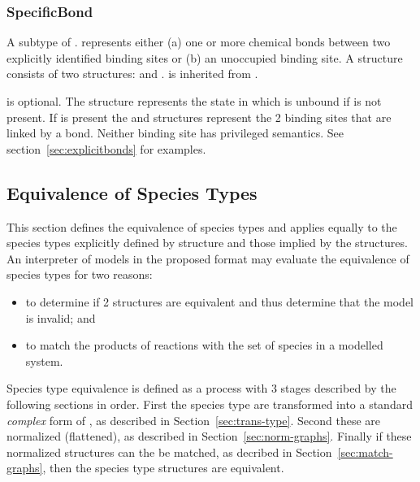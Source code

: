 \documentclass{cekarticle}
\begin{document}
\subsubsection{SpecificBond}

A subtype of .    represents
either (a) one or more chemical bonds between two explicitly
identified binding sites or (b) an unoccupied binding site.  A
 structure consists of two
 structures:  and
.  is
inherited from .

 is optional. The
 structure represents the state in which
 is unbound if
 is not present. If
 is present the
 and 
structures represent the 2 binding sites that are linked by a
bond. Neither binding site has privileged semantics. See
section~\ref{sec:explicitbonds} for examples.

\subsection{Equivalence of Species Types}
\label{sec:type-equals}

This section defines the equivalence of species types and applies
equally to the species types explicitly defined by
 structure and those implied by the
 structures.  An interpreter of models in the
proposed format may evaluate the equivalence of species types for
two reasons:

\begin{itemize}

\item to determine if 2  structures are equivalent
and thus determine that the model is invalid; and

\item to match the products of reactions with the set of species
in a modelled system.

\end{itemize}

Species type equivalence is defined as a process with 3 stages
described by the following sections in order.  First the species
type are transformed into a standard \emph{complex} form of
, as described in
Section~\ref{sec:trans-type}. Second these 
are normalized (flattened), as described in
Section~\ref{sec:norm-graphs}. Finally if these normalized
structures can the be matched, as decribed in
Section~\ref{sec:match-graphs}, then the species type structures
are equivalent.
\end{document}
